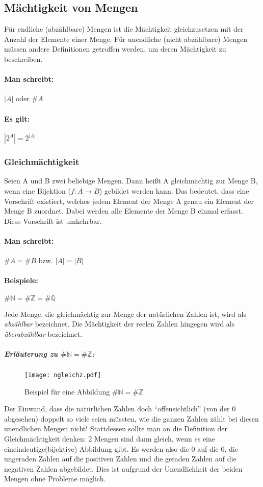 \subsection{Mächtigkeit von Mengen}
Für endliche (abzählbare) Mengen ist die Mächtigkeit gleichzusetzen mit der Anzahl
der Elemente einer Menge. Für unendliche (nicht abzählbare) Mengen müssen andere
Definitionen getroffen werden, um deren Mächtigkeit zu beschreiben.
\paragraph{Man schreibt:}
\({}|{}A{}|{}\) oder \(\#A\)
\paragraph{Es gilt:}
\begin{math}
{}|{}2^A{}|{} = 2^{{}|{}A{}|{}}
\end{math}
\subsubsection*{Gleichmächtigkeit}
Seien A und B zwei beliebige Mengen.
Dann heißt A gleichmächtig zur Menge B, wenn eine Bijektion (\({f:A}\rightarrow{B}\)) gebildet
werden kann. Das bedeutet, dass eine Vorschrift existiert, welches
jedem Element der Menge A genau ein Element der Menge B zuordnet.
Dabei werden alle Elemente der Menge B einmal erfasst. Diese
Vorschrift ist umkehrbar.
\paragraph{Man schreibt:} \(\#A = \#B\) bzw. \(|A| = |B|\)
\paragraph*{Beispiele:}
\begin{math}
\#{\mathbb N} = \#{\mathbb Z} = \#{\mathbb Q}
\end{math}

Jede Menge, die gleichmächtig zur Menge der natürlichen Zahlen ist, wird als \emph{abzählbar} bezeichnet.
Die Mächtigkeit der reelen Zahlen hingegen wird als \emph{überabzählbar} bezeichnet.
\subparagraph{Erläuterung zu \(\#{\mathbb N} = \#{\mathbb Z}\):}
\begin{figure}[b]
  \centering
  \caption{Beispiel für eine Abbildung \(\#{\mathbb N} = \#{\mathbb Z}\)}
  \texttt{[image: ngleichz.pdf]}
\end{figure}
Der Einwand, dass die natürlichen Zahlen doch ``offensichtlich'' (von der 0
abgesehen) doppelt so viele seien müssten, wie die ganzen Zahlen zählt
bei diesen unendlichen Mengen nicht! Stattdessen sollte man an die
Definition der Gleichmächtigkeit denken: 2 Mengen sind dann gleich,
wenn es eine eineindeutige(bijektive) Abbildung gibt.
Es werden also die 0 auf die 0, die ungeraden Zahlen auf die positiven
Zahlen und die geraden Zahlen auf die negativen Zahlen abgebildet.
Dies ist aufgrund der Unendlichkeit der beiden Mengen ohne Probleme
möglich.

